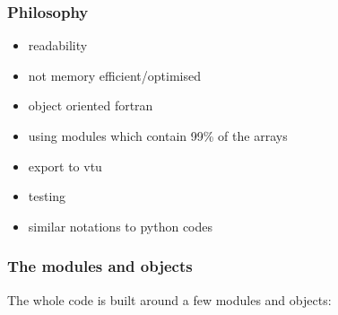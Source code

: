 \subsubsection{Philosophy}
\begin{itemize}
\item readability
\item not memory efficient/optimised
\item object oriented fortran
\item using modules which contain 99\% of the arrays
\item export to vtu 
\item testing
\item similar notations to python codes
\end{itemize}


\subsubsection{The modules and objects}
The whole code is built around a few modules and objects:

